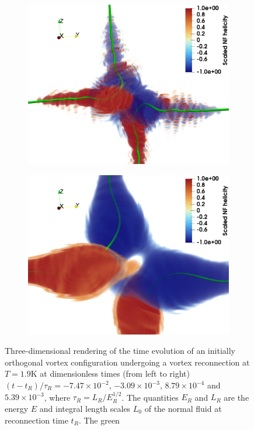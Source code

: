 \documentclass[%
 reprint,
 amsmath,amssymb,
 aps,
 prl,
]{revtex4-2}
\begin{document}
\begin{figure}
\begin{subfigure}[b]{0.24\textwidth}
		\includegraphics*[width=\textwidth]{snaps-hel-3.pdf}
	\end{subfigure}
    \begin{subfigure}[b]{0.24\textwidth}
		\centering
		\includegraphics*[width=\textwidth]{snaps-hel-4.pdf}
	\end{subfigure} \hfill
	\caption{
Three-dimensional rendering of the time evolution of
an initially orthogonal vortex configuration 
undergoing a vortex reconnection at $T = 1.9$K at dimensionless
times (from left to right)
$(t-t_R)/\tau_R=-7.47\times10^{-2}$, $-3.09\times10^{-3}$, $8.79\times10^{-4}$ and $5.39\times10^{-3}$, where $\tau_R = L_R/E^{1/2}_R$. The quantities $E_R$ and $L_R$ are the energy $E$ and integral length scales $L_0$ of the normal fluid at reconnection time $t_R$. The green
}
\end{figure}
\end{document}

